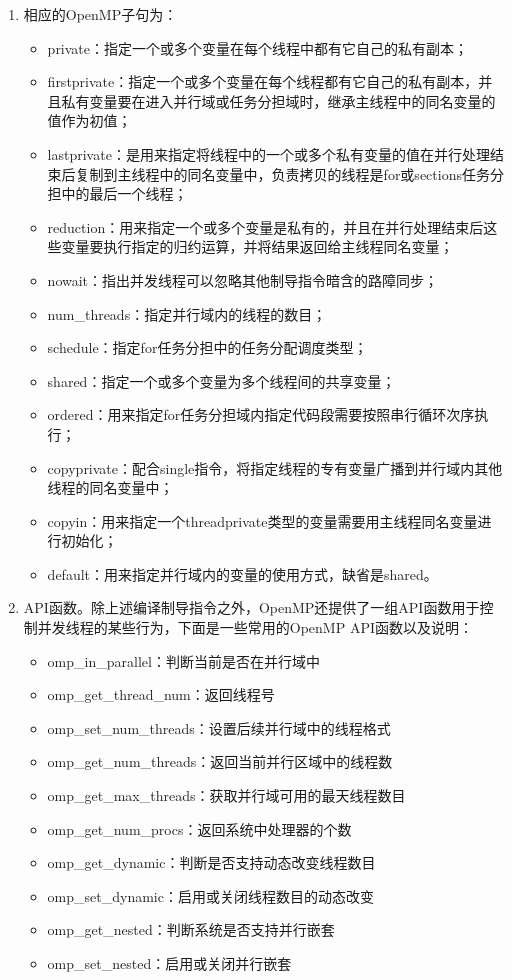 \documentclass[UTF-8, a4paper, 12pt]{ctexart}
\begin{document}
\begin{enumerate}
\item 相应的OpenMP子句为： 
\begin{itemize}
    \item private：指定一个或多个变量在每个线程中都有它自己的私有副本；
    \item firstprivate：指定一个或多个变量在每个线程都有它自己的私有副本，并且私有变量要在进入并行域或任务分担域时，继承主线程中的同名变量的值作为初值；
    \item lastprivate：是用来指定将线程中的一个或多个私有变量的值在并行处理结束后复制到主线程中的同名变量中，负责拷贝的线程是for或sections任务分担中的最后一个线程； 
    \item reduction：用来指定一个或多个变量是私有的，并且在并行处理结束后这些变量要执行指定的归约运算，并将结果返回给主线程同名变量；
    \item nowait：指出并发线程可以忽略其他制导指令暗含的路障同步；
    \item num\_threads：指定并行域内的线程的数目； 
    \item schedule：指定for任务分担中的任务分配调度类型；
    \item shared：指定一个或多个变量为多个线程间的共享变量；
    \item ordered：用来指定for任务分担域内指定代码段需要按照串行循环次序执行；
    \item copyprivate：配合single指令，将指定线程的专有变量广播到并行域内其他线程的同名变量中；
    \item copyin：用来指定一个threadprivate类型的变量需要用主线程同名变量进行初始化；
    \item default：用来指定并行域内的变量的使用方式，缺省是shared。
\end{itemize}
\item API函数。除上述编译制导指令之外，OpenMP还提供了一组API函数用于控制并发线程的某些行为，下面是一些常用的OpenMP API函数以及说明：
\begin{itemize}
    \item omp\_in\_parallel：判断当前是否在并行域中
    \item omp\_get\_thread\_num：返回线程号
    \item omp\_set\_num\_threads：设置后续并行域中的线程格式
    \item omp\_get\_num\_threads：返回当前并行区域中的线程数
    \item omp\_get\_max\_threads：获取并行域可用的最天线程数目
    \item omp\_get\_num\_procs：返回系统中处理器的个数
    \item omp\_get\_dynamic：判断是否支持动态改变线程数目
    \item omp\_set\_dynamic：启用或关闭线程数目的动态改变
    \item omp\_get\_nested：判断系统是否支持并行嵌套
    \item omp\_set\_nested：启用或关闭并行嵌套
    

\end{itemize}
\end{enumerate}
\end{document}

